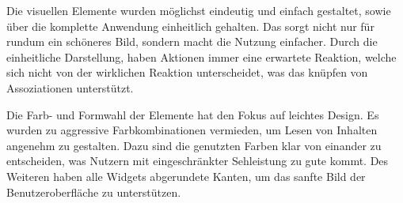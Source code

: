 Die visuellen Elemente wurden möglichst eindeutig und einfach gestaltet, sowie über die komplette Anwendung einheitlich gehalten. Das sorgt nicht nur für rundum ein schöneres Bild, sondern macht die Nutzung einfacher. Durch die einheitliche Darstellung, haben Aktionen immer eine erwartete Reaktion, welche sich nicht von der wirklichen Reaktion unterscheidet, was das knüpfen von Assoziationen unterstützt.

Die Farb- und Formwahl der Elemente hat den Fokus auf leichtes Design. Es wurden zu aggressive Farbkombinationen vermieden, um Lesen von Inhalten angenehm zu gestalten. Dazu sind die genutzten Farben klar von einander zu entscheiden, was Nutzern mit eingeschränkter Sehleistung zu gute kommt. Des Weiteren haben alle Widgets abgerundete Kanten, um das sanfte Bild der Benutzeroberfläche zu unterstützen.
